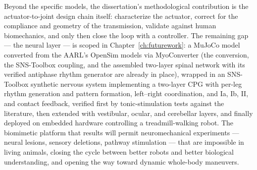 Beyond the specific models, the dissertation's methodological contribution is the actuator-to-joint design chain itself: characterize the actuator, correct for the compliance and geometry of the transmission, validate against human biomechanics, and only then close the loop with a controller. The remaining gap --- the neural layer --- is scoped in Chapter~\ref{ch:futurework}: a MuJoCo model converted from the AARL's OpenSim models via MyoConverter (the conversion, the SNS-Toolbox coupling, and the assembled two-layer spinal network with its verified antiphase rhythm generator are already in place), wrapped in an SNS-Toolbox synthetic nervous system implementing a two-layer CPG with per-leg rhythm generation and pattern formation, left--right coordination, and Ia, Ib, II, and contact feedback, verified first by tonic-stimulation tests against the literature, then extended with vestibular, ocular, and cerebellar layers, and finally deployed on embedded hardware controlling a treadmill-walking robot. The biomimetic platform that results will permit neuromechanical experiments --- neural lesions, sensory deletions, pathway stimulation --- that are impossible in living animals, closing the cycle between better robots and better biological understanding, and opening the way toward dynamic whole-body maneuvers.

